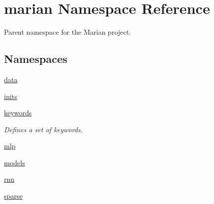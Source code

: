 \hypertarget{namespacemarian}{}\section{marian Namespace Reference}
\label{namespacemarian}


Parent namespace for the Marian project.  


\subsection*{Namespaces}
\begin{DoxyCompactItemize}
\item 
 \hyperlink{namespacemarian_1_1data}{data}
\item 
 \hyperlink{namespacemarian_1_1inits}{inits}
\item 
 \hyperlink{namespacemarian_1_1keywords}{keywords}
\begin{DoxyCompactList}\small\item\em Defines a set of keywords. \end{DoxyCompactList}\item 
 \hyperlink{namespacemarian_1_1mlp}{mlp}
\item 
 \hyperlink{namespacemarian_1_1models}{models}
\item 
 \hyperlink{namespacemarian_1_1rnn}{rnn}
\item 
 \hyperlink{namespacemarian_1_1sparse}{sparse}
\end{DoxyCompactItemize}
